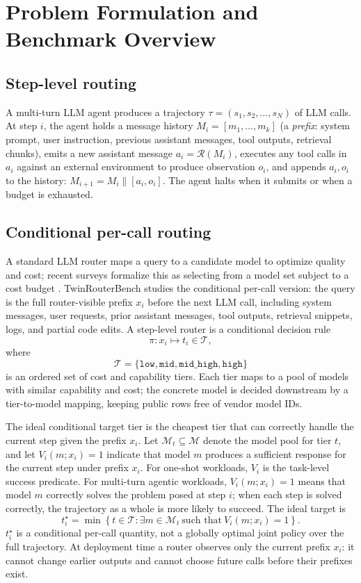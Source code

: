 \section{Problem Formulation and Benchmark Overview}
\label{sec:benchmark-overview}

\subsection{Step-level routing}

A multi-turn LLM agent produces a trajectory $\tau = (s_1, s_2, \ldots, s_N)$ of LLM calls. At step $i$, the agent holds a message history $M_i = [m_1, \ldots, m_k]$ (a \emph{prefix}: system prompt, user instruction, previous assistant messages, tool outputs, retrieval chunks), emits a new assistant message $a_i = \mathcal{R}(M_i)$, executes any tool calls in $a_i$ against an external environment to produce observation $o_i$, and appends $a_i, o_i$ to the history: $M_{i+1} = M_i \parallel [a_i, o_i]$. The agent halts when it submits or when a budget is exhausted.

\subsection{Conditional per-call routing}
\label{sec:conditional-per-call-routing}

A standard LLM router maps a query to a candidate model to optimize quality and
cost; recent surveys formalize this as selecting from a model set subject to a
cost budget \citep{varangotreille2025doing}. TwinRouterBench studies the
conditional per-call version: the query is the full router-visible prefix $x_i$
before the next LLM call, including system messages, user requests, prior
assistant messages, tool outputs, retrieval snippets, logs, and partial code
edits. A step-level router is a conditional decision rule
\[
\pi : x_i \mapsto t_i \in \mathcal T,
\]
where
\[
\mathcal T =
\{\texttt{low},\texttt{mid},\texttt{mid\_high},\texttt{high}\}
\]
is an ordered set of cost and capability tiers. Each tier maps to a pool of models
with similar capability and cost; the concrete model is decided downstream by a
tier-to-model mapping, keeping public rows free of vendor model IDs.

The ideal conditional target tier is the cheapest tier that can
correctly handle the current step given the prefix $x_i$.
Let $\mathcal M_t\subseteq\mathcal M$ denote the model pool for tier
$t$, and let $V_i(m;x_i)=1$ indicate that model $m$ produces a sufficient
response for the current step under prefix $x_i$. For one-shot workloads,
$V_i$ is the task-level success predicate. For multi-turn agentic workloads,
$V_i(m;x_i)=1$ means that model $m$ correctly solves the problem posed at
step $i$; when each step is solved correctly, the trajectory as a whole is
more likely to succeed. The ideal target is
\[
t_i^\star
=
\min\left\{
t\in\mathcal T:
\exists m\in\mathcal M_t
\ \text{such that}\
V_i(m;x_i)=1
\right\}.
\]
$t_i^\star$ is a conditional per-call quantity, not a globally optimal joint
policy over the full trajectory. At deployment time a router observes only the
current prefix $x_i$: it cannot change earlier outputs and cannot choose future
calls before their prefixes exist.

